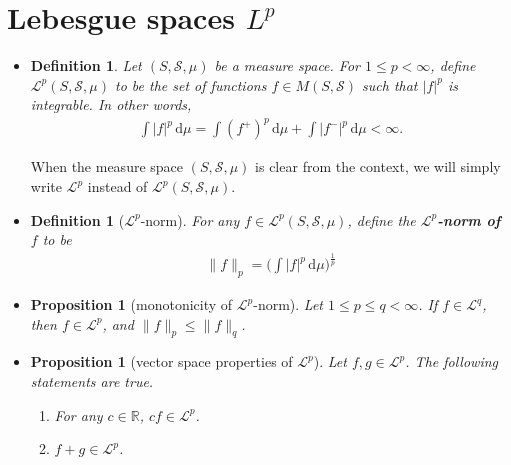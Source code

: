 \documentclass[10pt]{article}
\newtheorem{definition}[lemma]{Definition}
\newtheorem{proposition}[lemma]{Proposition}
\numberwithin{lemma}{section}
\newcommand{\dee}{\mathrm{d}}
\newcommand{\mcal}[1]{\mathcal{#1}}
\newcommand{\Real}{\mathbb{R}}
\begin{document}
\section{Lebesgue spaces $L^p$}

\begin{itemize}
  \item \begin{definition}
    Let $(S, \mcal{S}, \mu)$ be a measure space. For $1 \leq p < \infty$, define $\mcal{L}^p(S,\mcal{S}, \mu)$ to be the set of functions $f \in M(S,\mcal{S})$ such that $|f|^p$ is integrable. In other words,
    \begin{align*}
      \int |f|^p\, \dee\mu = \int (f^+)^p\, \dee\mu + \int |f^-|^p\, \dee\mu < \infty.
    \end{align*}
  \end{definition}
  When the measure space $(S, \mcal{S}, \mu)$ is clear from the context, we will simply write $\mcal{L}^p$ instead of $\mcal{L}^p(S,\mcal{S}, \mu)$.

  \item \begin{definition}[$\mcal{L}^p$-norm]
    For any $f \in \mcal{L}^p(S,\mcal{S},\mu)$, define the {\bf $\mcal{L}^p$-norm of $f$} to be
    \begin{align*}
      \| f \|_p = \bigg( \int |f|^p\, \dee\mu \bigg)^{\frac{1}{p}}
    \end{align*} 
  \end{definition}

  \item \begin{proposition}[monotonicity of $\mcal{L}^p$-norm] \label{thm:Lp-norm-monotonicity}
    Let $1 \leq p \leq q < \infty$. If $f \in \mcal{L}^q$, then $f \in \mcal{L}^p$, and $\| f \|_p \leq \| f \|_q$.
  \end{proposition}

  \item \begin{proposition}[vector space properties of $\mcal{L}^p$]
    Let $f, g \in \mcal{L}^p$. The following statements are true.
    \begin{enumerate}
      \item For any $c \in \Real$, $cf \in \mcal{L}^p$.
      \item $f + g \in \mcal{L}^p$.
    \end{enumerate}
  \end{proposition}


\end{itemize}
\end{document}
